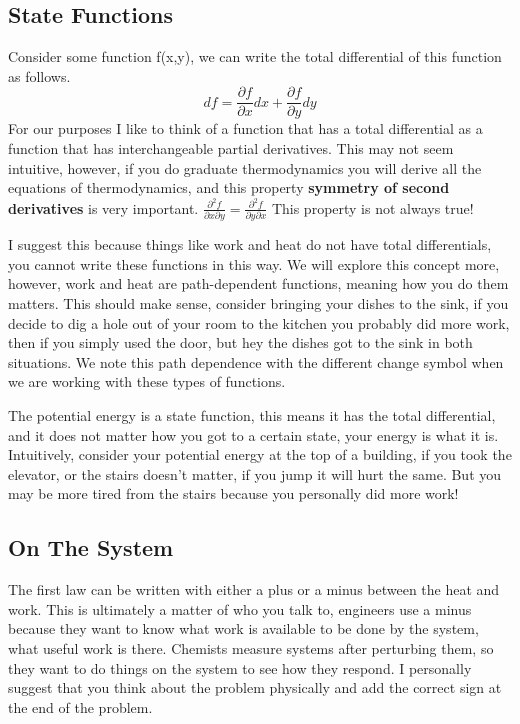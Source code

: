 \documentclass{article}
\begin{document}
\subsection*{State Functions}
Consider some function f(x,y), we can write the total differential of this function as follows. 
\begin{equation}
df = \frac{\partial f}{\partial x}dx + \frac{\partial f}{\partial y}dy
\end{equation}
For our purposes I like to think of a function that has a total differential as a function that has interchangeable partial derivatives. 
This may not seem intuitive, however, if you do graduate thermodynamics you will derive all the equations of thermodynamics, and this property \textbf{symmetry of second derivatives} is very important. $\frac{\partial^2f}{\partial x \partial y} = \frac{\partial^2f}{\partial y \partial x}$ This property is not always true!

I suggest this because things like work and heat do not have total differentials, you cannot write these functions in this way. 
We will explore this concept more, however, work and heat are path-dependent functions, meaning how you do them matters.
This should make sense, consider bringing your dishes to the sink, if you decide to dig a hole out of your room to the kitchen you probably did more work, then if you simply used the door, but hey the dishes got to the sink in both situations. 
We note this path dependence with the different change symbol when we are working with these types of functions. 

The potential energy is a state function, this means it has the total differential, and it does not matter how you got to a certain state, your energy is what it is. 
Intuitively, consider your potential energy at the top of a building, if you took the elevator, or the stairs doesn't matter, if you jump it will hurt the same. 
But you may be more tired from the stairs because you personally did more work!

\subsection*{On The System}
The first law can be written with either a plus or a minus between the heat and work. 
This is ultimately a matter of who you talk to, engineers use a minus because they want to know what work is available to be done by the system, what useful work is there. 
Chemists measure systems after perturbing them, so they want to do things on the system to see how they respond.
I personally suggest that you think about the problem physically and add the correct sign at the end of the problem. 
\end{document}
